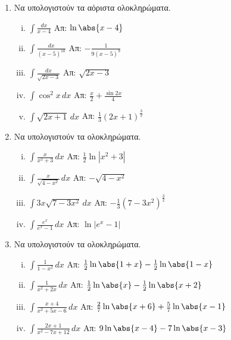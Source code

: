 


\everymath{\displaystyle}
\pagestyle{askhseis}




\begin{center}
  \minibox{{\bfseries \large \textcolor{Col1}{Ασκήσεις στα Ολοκληρώματα}}}
\end{center}

\vspace{\baselineskip}



\begin{enumerate}

\item Να υπολογιστούν τα αόριστα ολοκληρώματα.


\begin{enumerate}[i)]
    \item $ \int \frac{dx}{x-4}$ \hfill Απ: $ \ln{\abs{x-4}} $ 
    \item $\int\frac{dx}{(x-5)^{10}} $ \hfill Απ: $-\frac{1}{9(x-5)^9}$
    \item $ \int\frac{dx}{\sqrt{2x-3}}$ \hfill Απ: $ \sqrt{2x-3} $
    \item $\int\cos^2x \, dx$ \hfill Απ: $\frac{x}{2} + \frac{\sin2x}{4}$
    \item $ \int \sqrt{ 2x+1 } \,{dx} $ \hfill Απ: 
        $ \frac{ 1 }{ 3 } (2x+1)^{\frac{ 3 }{ 2 } } $
\end{enumerate}


\item Να υπολογιστούν τα ολοκληρώματα.

  \begin{enumerate}[i)]
    \item $\int\frac{x}{x^2+3} \, dx$ \hfill Απ: $\frac{1}{2}\ln|x^2+3|$
    \item $ \int \frac{x}{\sqrt{4-x^{2}}} \,{dx} $ \hfill Απ: $ - \sqrt{4-x^{2}} $ 
    \item $ \int 3x \sqrt{ 7-3x^{2} } \,{dx} $ 
      \hfill Απ: $ - \frac{1}{ 3 } (7-3x^{2})^{\frac{ 3 }{ 2 }} $
    \item $\int \frac{e^x}{e^x-1} \, dx$ \hfill Απ: $\ln|e^x-1|$
  \end{enumerate}

\item Να υπολογιστούν τα ολοκληρώματα.

  \begin{enumerate}[i)]
    \item $ \int \frac{1}{1-x^{2}} \,{dx} $ \hfill Απ: $ \frac{1}{2} \ln{\abs{1+x} - 
        \frac{1}{2} \ln{\abs{1-x}}} $
    \item $ \int \frac{1}{x^{2}+2x} \,{dx} $ \hfill Απ: $ \frac{1}{2} \ln{\abs{x}} -
      \frac{1}{2} \ln{\abs{x+2}} $ 
    \item $ \int \frac{x+4}{x^{2}+5x-6} \,{dx} $ \hfill Απ: $ \frac{2}{7}
    \ln{\abs{x+6}} + \frac{5}{7} \ln{\abs{x-1}} $
  \item $ \int \frac{2x+1}{x^{2}-7x+12} \,{dx} $ \hfill Απ: $ 9 \ln{\abs{x-4}} - 7
    \ln{\abs{x-3}} $ 
  \end{enumerate}


\end{enumerate}
